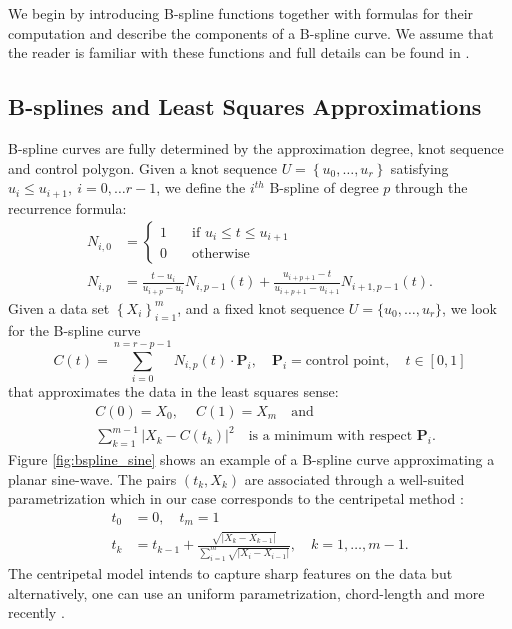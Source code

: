 We begin by introducing B-spline functions together with formulas for their computation and 
describe the components of a B-spline curve. 
We assume that the reader is familiar with these functions and full details can be found in 
 \cite{nurbs_book, deboor2001practical, schumaker2015spline}. 
  \subsection*{B-splines and Least Squares Approximations}
B-spline curves are fully determined by the approximation degree, 
knot sequence and control polygon. Given a knot sequence $U=\left\{u_0,\ldots,u_r\right\}$ satisfying 
 $u_i\leq u_{i+1},\  i=0,\ldots r-1$, we define 
 the $i^{th}$ B-spline of degree $p$ through the recurrence formula:
 \begin{align}
 N_{i,0} &= \left\{ \begin{aligned}
                    1 \quad &\text{if } u_i\leq t\leq u_{i+1}\\
                    0 \quad &\text{otherwise }
                   \end{aligned}\right. \\
N_{i,p} &= \frac{t - u_i}{u_{i+p} - u_i}N_{i,p-1}(t) +  \frac{u_{i+p+1} - t}{u_{i+p+1} - u_{i+1}}N_{i+1,p-1}(t).
 \end{align}
 Given a data set $\left\{X_i\right\}_{i=1}^m$, and a fixed knot sequence $U=\{u_0,\ldots,u_r\}$, 
 we 
look for the B-spline curve 
\begin{equation}
 C(t) = \sum_{i=0}^{n=r-p-1} N_{i,p}(t)\cdot \mathbf P_i,\quad \mathbf P_i = \text{control point} ,\quad t\in[0,1]
\end{equation}
that approximates the data in the least squares sense:
\begin{align}\label{eq:least_squares_problem}
 & C(0)= X_0, \quad \  C(1) = X_m\quad \text{and}\\
 &\sum _{k= 1}^{m-1}\left | X_k - C(t_k)\right|^2\quad \text{is a minimum with respect }\mathbf P_i.
\end{align}
Figure \ref{fig:bspline_sine} shows an example of a B-spline curve approximating a planar sine-wave.
The pairs $(t_k,X_k)$ are associated through a well-suited parametrization 
which in our case corresponds to the centripetal method \cite{lee1989}:
\begin{align}
 t_0 &= 0,\quad t_m = 1\\
 t_k &= t_{k-1} + \frac{\sqrt{ |X_k - X_{k-1}|}}{\sum_{i = 1} ^ m \sqrt{|X_i- X_{i-1}|}}, \quad k = 1,\ldots,m-1.
\end{align}
The centripetal model intends to capture sharp features on the data but alternatively, 
one can use an uniform \cite{} parametrization, chord-length \cite{} 
and more recently \cite{}. 

